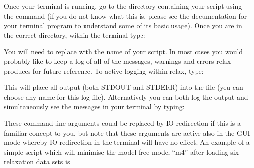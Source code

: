Once your terminal is running, go to the directory containing your script using the  command (if you do not know what this is, please see the documentation for your terminal program to understand some of its basic usage).  Once you are in the correct directory, within the terminal type:


You will need to replace  with the name of your script.  In most cases you would probably like to keep a log of all of the messages, warnings and errors relax produces for future reference.  To active logging within relax, type:


This will place all output (both STDOUT and STDERR) into the  file (you can choose any name for this log file).  Alternatively you can both log the output and simultaneously see the messages in your terminal by typing:


These command line arguments could be replaced by IO redirection if this is a familiar concept to you, but note that these arguments are active also in the GUI mode whereby IO redirection in the terminal will have no effect.   An example of a simple script which will minimise the model-free model ``m4'' after loading six relaxation data sets is

